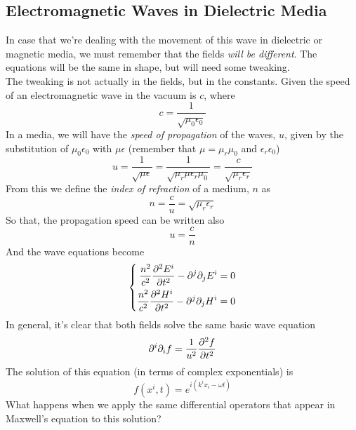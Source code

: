 \documentclass[../electromagnetism.tex]{subfiles}
\begin{document}
\subsection{Electromagnetic Waves in Dielectric Media}
In case that we're dealing with the movement of this wave in dielectric or magnetic media, we must remember that the fields \emph{will be different}. The equations will be the same in shape, but will need some tweaking.\\
The tweaking is not actually in the fields, but in the constants. Given the speed of an electromagnetic wave in the vacuum is $c$, where
\begin{equation*}
	c=\frac{1}{\sqrt{\mu_0\epsilon_0}}
\end{equation*}
In a media, we will have the \textit{speed of propagation} of the waves, $u$, given by the substitution of $\mu_0\epsilon_0$ with $\mu\epsilon$ (remember that $\mu=\mu_r\mu_0$ and $\epsilon_r\epsilon_0$)
\begin{equation}
	u=\frac{1}{\sqrt{\mu\epsilon}}=\frac{1}{\sqrt{\mu_r\mu\epsilon_r\mu_0}}=\frac{c}{\sqrt{\mu_r\epsilon_r}}
	\label{eq:speedofprop}
\end{equation}
From this we define the \textit{index of refraction} of a medium, $n$ as
\begin{equation}
	n=\frac{c}{u}=\sqrt{\mu_r\epsilon_r}
	\label{eq:refractionindex}
\end{equation}
So that, the propagation speed can be written also
\begin{equation*}
	u=\frac{c}{n}
\end{equation*}
And the wave equations become
\begin{equation}
	\left\{ \begin{aligned}
			\frac{n^2}{c^2}\pdv[2]{E^i}{t}-\partial^j\partial_jE^i&= 0\\
			\frac{n^2}{c^2}\pdv[2]{H^i}{t}-\partial^j\partial_jH^i&= 0
	\end{aligned}\right.
	\label{eq:waveequationinmedia}
\end{equation}
In general, it's clear that both fields solve the same basic wave equation
\begin{equation*}
	\partial^i\partial_if=\frac{1}{u^2}\pdv[2]{f}{t}
\end{equation*}
The solution of this equation (in terms of complex exponentials) is
\begin{equation}
	f(x^i,t)=e^{i\left( k^ix_i-\omega t \right)}
	\label{eq:wavesolutionemwaves}
\end{equation}
What happens when we apply the same differential operators that appear in Maxwell's equation to this solution?\\
\end{document}
